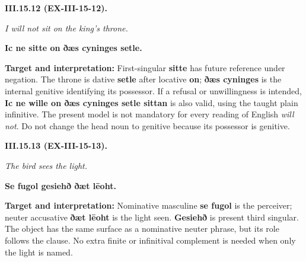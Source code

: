 \par\begin{minipage}{\linewidth}\raggedright
\textbf{III.15.12 (EX-III-15-12).}

\emph{I will not sit on the king’s throne.}

\textbf{Ic ne sitte on ðæs cyninges setle.}

\textbf{Target and interpretation:} First-singular \textbf{sitte} has future reference under negation. The throne is dative \textbf{setle} after locative \textbf{on}; \textbf{ðæs cyninges} is the internal genitive identifying its possessor. If a refusal or unwillingness is intended, \textbf{Ic ne wille on ðæs cyninges setle sittan} is also valid, using the taught plain infinitive. The present model is not mandatory for every reading of English \emph{will not}. Do not change the head noun to genitive because its possessor is genitive.

\end{minipage}\par\addvspace{4pt}

\par\begin{minipage}{\linewidth}\raggedright
\textbf{III.15.13 (EX-III-15-13).}

\emph{The bird sees the light.}

\textbf{Se fugol gesiehð ðæt lēoht.}

\textbf{Target and interpretation:} Nominative masculine \textbf{se fugol} is the perceiver; neuter accusative \textbf{ðæt lēoht} is the light seen. \textbf{Gesiehð} is present third singular. The object has the same surface as a nominative neuter phrase, but its role follows the clause. No extra finite or infinitival complement is needed when only the light is named.

\end{minipage}\par\addvspace{4pt}

